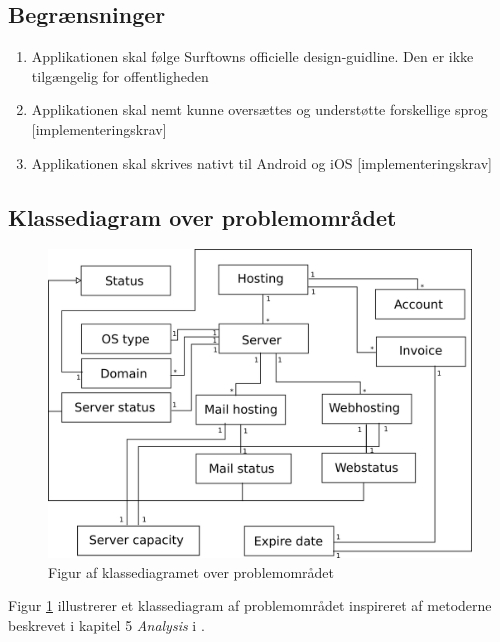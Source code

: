 \documentclass[12pt]{article}
\begin{document}
\subsection*{Begrænsninger}
\label{constrains}
\begin{enumerate}
  \item{Applikationen skal følge Surftowns officielle design-guidline. Den er ikke tilgængelig for offentligheden}
  \item{Applikationen skal nemt kunne oversættes og understøtte forskellige sprog [implementeringskrav]}
  \item{Applikationen skal skrives nativt til Android og iOS [implementeringskrav]}
\end{enumerate}

\subsection*{Klassediagram over problemområdet}
\label{class_diagram_section}
\begin{figure}[h]
	\centering
	\includegraphics[width=13cm]{class_diagram_v2.png}
	\caption{Figur af klassediagramet over problemområdet}
	\label{class_diagram}
\end{figure}
Figur \ref{class_diagram} illustrerer et klassediagram af problemområdet inspireret af metoderne beskrevet i kapitel 5 \emph{Analysis} i \cite{OOSE}. 
\end{document}
